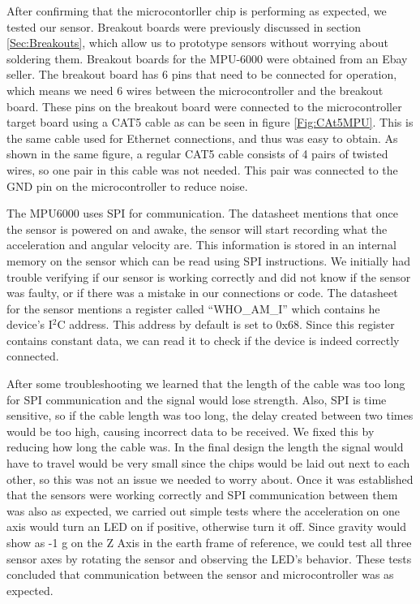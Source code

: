 After confirming that the microcontorller chip is performing as expected,
we tested our sensor. Breakout boards were previously discussed in section \ref{Sec:Breakouts},
which allow us to prototype sensors without worrying about soldering them.
Breakout boards for the MPU-6000 were obtained from an Ebay seller.
The breakout board has 6 pins that need to be connected for operation,
which means we need 6 wires between the microcontroller and the breakout board.
These pins on the breakout board were connected to the microcontroller target board using a CAT5 cable as can be seen in figure \ref{Fig:CAt5MPU}.
This is the same cable used for Ethernet connections, and thus was easy to obtain.
As shown in the same figure,
a regular CAT5 cable consists of 4 pairs of twisted wires,
so one pair in this cable was not needed.
This pair was connected to the GND pin on the microcontroller to reduce noise.

The MPU6000 uses SPI for communication.
The datasheet mentions that once the sensor is powered on and awake,
the sensor will start recording what the acceleration and angular velocity are.
This information is stored in an internal memory on the sensor which can be read using SPI instructions.
We initially had trouble verifying if our sensor is working correctly and did not know if the sensor was faulty,
or if there was a mistake in our connections or code.
The datasheet for the sensor mentions a register called ``WHO\_AM\_I'' which contains he device's I$^2$C address.
This address by default is set to 0x68.
Since this register contains constant data, we can read it to check if the device is indeed correctly connected.

After some troubleshooting we learned that the length of the cable was too long for SPI communication and the signal would lose strength.
Also, SPI is time sensitive, so if the cable length was too long,
the delay created between two times would be too high,
causing incorrect data to be received.
We fixed this by reducing how long the cable was.
In the final design the length the signal would have to travel would be very small since the chips would be laid out next to each other,
so this was not an issue we needed to worry about.
Once it was established that the sensors were working correctly and SPI communication between them was also as expected,
we carried out simple tests where the acceleration on one axis would turn an LED on if positive,
otherwise turn it off.
Since gravity would show as -1 g on the Z Axis in the earth frame of reference,
we could test all three sensor axes by rotating the sensor and observing the LED's behavior.
These tests concluded that communication between the sensor and microcontroller was as expected.

